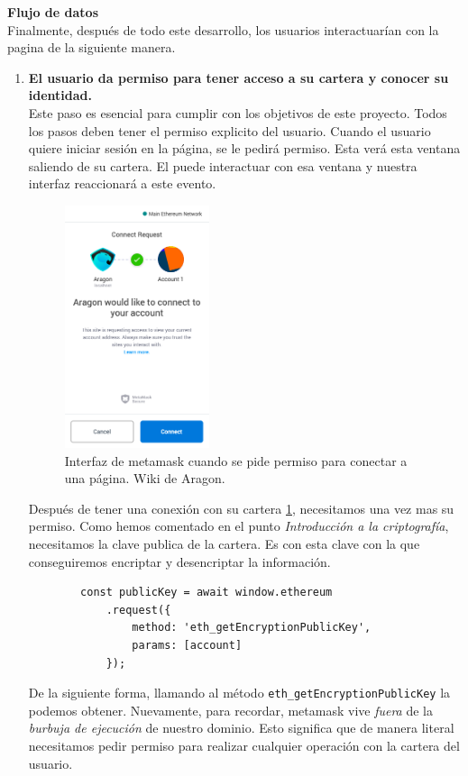 \textbf{Flujo de datos}\\
Finalmente, después de todo este desarrollo, los usuarios interactuarían con la pagina de la siguiente manera.
\begin{enumerate}
    \item \textbf{El usuario da permiso para tener acceso a su cartera y conocer su identidad.}\\
    Este paso es esencial para cumplir con los objetivos de este proyecto. Todos los pasos deben tener el permiso explicito del usuario. Cuando el usuario quiere iniciar sesión en la página, se le pedirá permiso. Esta verá esta ventana saliendo de su cartera. El puede interactuar con esa ventana y nuestra interfaz reaccionará a este evento.
    \begin{figure}[h!]
        \centering
        \includegraphics[width=0.4\textwidth]{Figures/metamask.png}
        \caption[Interfaz de metamask]{Interfaz de metamask cuando se pide permiso para conectar a una página. Wiki de Aragon. \cite{web:aragon}}
        \label{fg:aragon}
    \end{figure}
    Después de tener una conexión con su cartera \ref{fg:aragon}, necesitamos una vez mas su permiso. Como hemos comentado en el punto \textit{Introducción a la criptografía}, necesitamos la clave publica de la cartera. Es con esta clave con la que conseguiremos encriptar y desencriptar la información.
    \begin{lstlisting}
        const publicKey = await window.ethereum
			.request({
				method: 'eth_getEncryptionPublicKey',
				params: [account]
			});
    \end{lstlisting}
    De la siguiente forma, llamando al método \verb|eth_getEncryptionPublicKey| la podemos obtener. Nuevamente, para recordar, metamask vive \textit{fuera} de la \textit{burbuja de ejecución} de nuestro dominio. Esto significa que de manera literal necesitamos pedir permiso para realizar cualquier operación con la cartera del usuario.

\end{enumerate}
